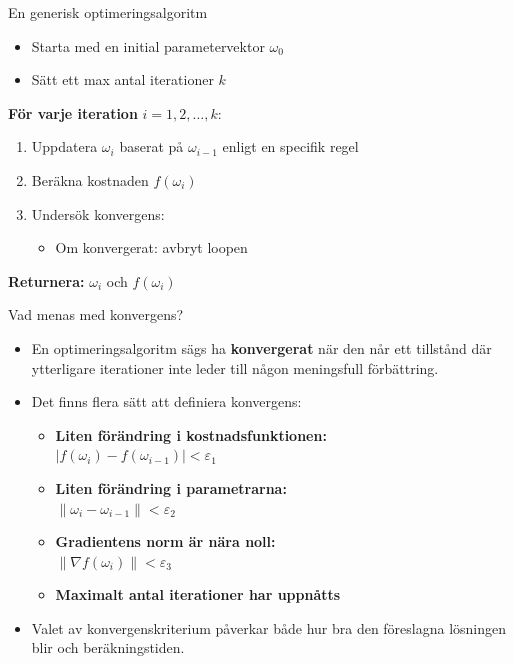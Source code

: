 \documentclass[10pt,english]{beamer}
\begin{document}
\begin{frame}{En generisk optimeringsalgoritm}
  \begin{itemize}
    \item Starta med en initial parametervektor \( \omega_0 \)
    \item Sätt ett max antal iterationer \( k \)
  \end{itemize}

  \vspace{1em}
  \textbf{För varje iteration } \( i = 1, 2, \dots, k \):
  \begin{enumerate}
    \item Uppdatera \( \omega_i \) baserat på \( \omega_{i-1} \) enligt en specifik regel
    \item Beräkna kostnaden \( f\left(\omega_i\right) \)
    \item Undersök konvergens:
    \begin{itemize}
      \item Om konvergerat: avbryt loopen
    \end{itemize}
  \end{enumerate}

  \vspace{0.5em}
  \textbf{Returnera:} \( \omega_i \) och \( f\left(\omega_i\right) \)
\end{frame}


\begin{frame}{Vad menas med konvergens?}
  \begin{itemize}
    \item En optimeringsalgoritm sägs ha \textbf{konvergerat} när den når ett tillstånd där ytterligare iterationer inte leder till någon meningsfull förbättring.
    \item Det finns flera sätt att definiera konvergens:
    \begin{itemize}
      \item \textbf{Liten förändring i kostnadsfunktionen:} \\
        \( |f(\omega_{i}) - f(\omega_{i-1})| < \varepsilon_{1} \)
      \item \textbf{Liten förändring i parametrarna:} \\
        \( \|\omega_{i} - \omega_{i-1}\| < \varepsilon_{2} \)
      \item \textbf{Gradientens norm är nära noll:} \\
        \( \|\nabla f(\omega_{i})\| < \varepsilon_{3} \)
      \item \textbf{Maximalt antal iterationer har uppnåtts}
    \end{itemize}
    \item Valet av konvergenskriterium påverkar både hur bra den föreslagna lösningen blir och beräkningstiden.
  \end{itemize}
\end{frame}
\end{document}
